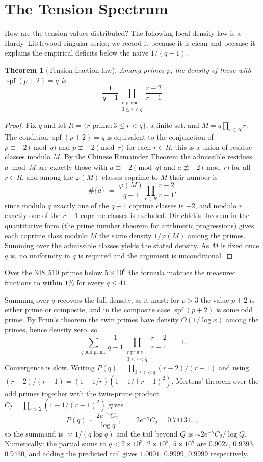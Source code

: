 \documentclass[11pt]{article}
\theoremstyle{plain}
\newtheorem{theorem}{Theorem}
\theoremstyle{definition}
\theoremstyle{remark}
\newcommand{\spf}{\operatorname{spf}}
\begin{document}
\section{The Tension Spectrum}

How are the tension values distributed? The following local-density law is a
Hardy--Littlewood singular series; we record it because it is clean and because
it explains the empirical deficits below the naive $1/(q-1)$.

\begin{theorem}[Tension-fraction law]\label{thm:singular}
Among primes $p$, the density of those with $\spf(p+2)=q$ is
\[
\frac{1}{q-1}\prod_{\substack{r\text{ prime}\\ 3\le r<q}}\frac{r-2}{r-1}.
\]
\end{theorem}
\begin{proof}
Fix $q$ and let $R=\{r \text{ prime}: 3\le r<q\}$, a finite set, and
$M=q\prod_{r\in R}r$. The condition $\spf(p+2)=q$ is equivalent to the
conjunction of $p\equiv-2\pmod q$ and $p\not\equiv-2\pmod r$ for each $r\in R$;
this is a union of residue classes modulo $M$. By the Chinese Remainder Theorem
the admissible residues $a\bmod M$ are exactly those with $a\equiv-2\pmod q$ and
$a\not\equiv-2\pmod r$ for all $r\in R$, and among the $\varphi(M)$ classes
coprime to $M$ their number is
\[
  \#\{a\} \;=\; \frac{\varphi(M)}{q-1}\prod_{r\in R}\frac{r-2}{r-1},
\]
since modulo $q$ exactly one of the $q-1$ coprime classes is $-2$, and modulo
$r$ exactly one of the $r-1$ coprime classes is excluded. Dirichlet's theorem in
the quantitative form (the prime number theorem for arithmetic progressions)
gives each coprime class modulo $M$ the same density $1/\varphi(M)$ among the
primes. Summing over the admissible classes yields the stated density. As $M$ is
fixed once $q$ is, no uniformity in $q$ is required and the argument is
unconditional.
\end{proof}

Over the $348{,}510$ primes below $5\times10^6$ the formula matches the measured
fractions to within $1\%$ for every $q\le 41$.

Summing over $q$ recovers the full density, as it must: for $p>3$ the value
$p+2$ is either prime or composite, and in the composite case $\spf(p+2)$ is
some odd prime. By Brun's theorem the twin primes have density $O(1/\log x)$
among the primes, hence density zero, so
\[
  \sum_{q\ \mathrm{odd\ prime}} \frac{1}{q-1}
  \prod_{\substack{r\ \mathrm{prime}\\ 3\le r<q}}\frac{r-2}{r-1} \;=\; 1 .
\]
Convergence is slow. Writing $P(q)=\prod_{3\le r<q}(r-2)/(r-1)$ and using
$(r-2)/(r-1) = (1-1/r)(1-1/(r-1)^2)$, Mertens' theorem over the odd primes
together with the twin-prime product $C_2=\prod_{r>2}(1-1/(r-1)^2)$ gives
\[
  P(q) \sim \frac{2e^{-\gamma}C_2}{\log q}, \qquad
  2e^{-\gamma}C_2 = 0.74131\ldots,
\]
so the summand is $\asymp 1/(q\log q)$ and the tail beyond $Q$ is
$\sim 2e^{-\gamma}C_2/\log Q$. Numerically: the partial sums to
$q<2\times10^3$, $2\times10^5$, $5\times10^5$ are $0.9027$, $0.9393$, $0.9450$,
and adding the predicted tail gives $1.0001$, $0.9999$, $0.9999$ respectively.
\end{document}

